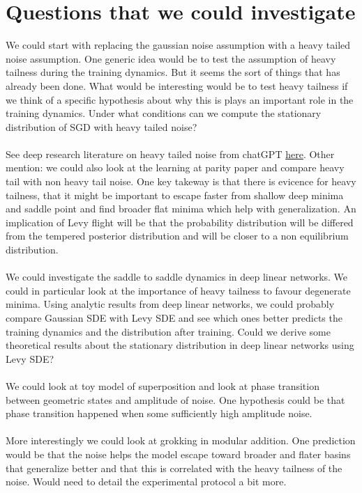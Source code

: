 \documentclass[11pt]{article}
\begin{document}
\section{Questions that we could investigate}
We could start with replacing the gaussian noise assumption with a heavy tailed noise assumption. One generic idea would be to test the assumption of heavy tailness during the training dynamics. But it seems the sort of things that has already been done. What would be interesting would be to test heavy tailness if we think of a specific hypothesis about why this is plays an important role in the training dynamics. Under what conditions can we compute the stationary distribution of SGD with heavy tailed noise? 
\\
\\
See deep research literature on heavy tailed noise from chatGPT \href{https://chatgpt.com/s/dr_6853577008f88191bba42f17cbfbbc95}{here}.
Other mention: we could also look at the learning at parity paper and compare heavy tail with non heavy tail noise. One key takeway is that there is evicence for heavy tailness, that it might be important to escape faster from shallow deep minima and saddle point and find broader flat minima which help with generalization. An implication of Levy flight will be that the probability distribution will be differed from the tempered posterior distribution and will be closer to a non equilibrium distribution. 
\\
\\
We could investigate the saddle to saddle dynamics in deep linear networks. We could in particular look at the importance of heavy tailness to favour degenerate minima. Using analytic results from deep linear networks, we could probably compare Gaussian SDE with Levy SDE and see which ones better predicts the training dynamics and the distribution after training. Could we derive some theoretical results about the stationary distribution in deep linear networks using Levy SDE? 
\\
\\
We could look at toy model of superposition and look at phase transition between geometric states and amplitude of noise. One hypothesis could be that phase transition happened when some sufficiently high amplitude noise.
\\
\\
More interestingly we could look at grokking in modular addition. One prediction would be that the noise helps the model escape toward broader and flater basins that generalize better and that this is correlated with the heavy tailness of the noise. Would need to detail the experimental protocol a bit more.
\end{document}
